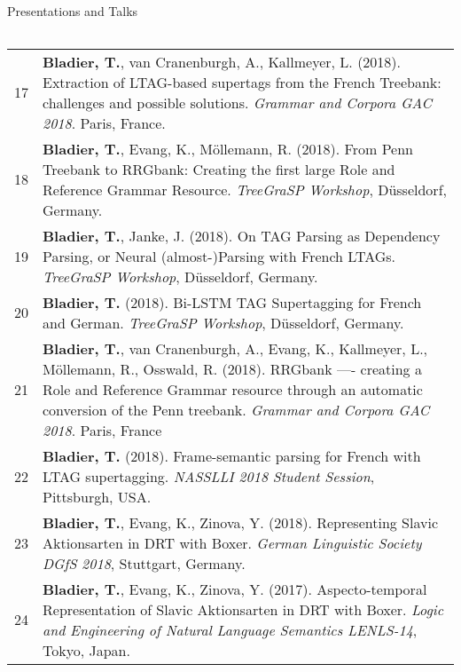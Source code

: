\documentclass{resume} %
\begin{document}
\begin{rSection}{Presentations and Talks}
\begin{tabular}{p{0.1cm}p{17cm}}
  \end{tabular}

\begin{tabular}{p{0.1cm}p{17cm}}
17 & {\bf Bladier, T.}, van Cranenburgh, A.,  Kallmeyer, L. (2018). Extraction of LTAG-based supertags from the French Treebank: challenges and possible solutions. {\it Grammar and Corpora GAC 2018}. Paris, France.\\[5pt]  
18 & {\bf Bladier, T.}, Evang, K., M{\"o}llemann, R. (2018). From Penn Treebank to RRGbank: Creating the first large Role and Reference Grammar Resource. {\it TreeGraSP Workshop}, D{\"u}sseldorf, Germany. \\[5pt]
19 & {\bf Bladier, T.}, Janke, J. (2018). On TAG Parsing as Dependency Parsing, or Neural (almost-)Parsing with French LTAGs. {\it TreeGraSP Workshop}, D{\"u}sseldorf, Germany. \\[5pt]
 20 & {\bf Bladier, T.} (2018). Bi-LSTM TAG Supertagging for French and German. {\it TreeGraSP Workshop}, D{\"u}sseldorf, Germany.  \\[5pt]
  21 &{\bf Bladier, T.}, van Cranenburgh, A., Evang, K., Kallmeyer, L., M{\"o}llemann, R., Osswald, R. (2018).  RRGbank —- creating a Role and Reference Grammar resource through an automatic conversion of the Penn treebank. {\it Grammar and Corpora GAC 2018}. Paris, France  \\[5pt]
 22 & {\bf Bladier, T.} (2018). Frame-semantic parsing for French with LTAG supertagging. {\it NASSLLI 2018 Student Session}, Pittsburgh, USA.  \\[5pt] 
 23 & {\bf Bladier, T.}, Evang, K., Zinova, Y. (2018). Representing Slavic Aktionsarten in DRT with Boxer. {\it German Linguistic Society DGfS 2018}, Stuttgart, Germany. \\[5pt]
 24 & {\bf Bladier, T.}, Evang, K., Zinova, Y. (2017). Aspecto-temporal Representation of Slavic Aktionsarten in DRT with Boxer. {\it  Logic and Engineering of Natural Language Semantics LENLS-14}, Tokyo, Japan. \\[20pt]
 
\end{tabular}

\end{rSection}
\end{document}
